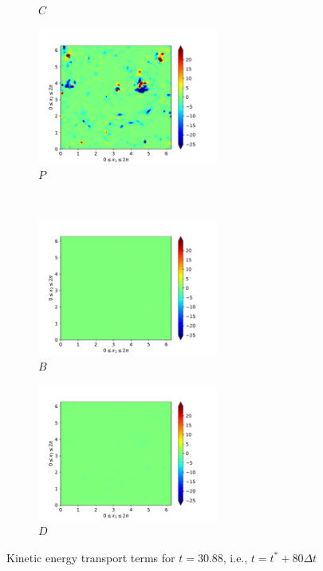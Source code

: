 \begin{figure}[H]
\begin{subfigure}{0.45\textwidth}
        \caption{$C$}
    \end{subfigure}
    \newline
    \begin{subfigure}{0.45\textwidth}
        \includegraphics[height=1.75in]{media/run-cds-65/P-ke-1420}
        \caption{$P$}
    \end{subfigure}
    ~
    \begin{subfigure}{0.45\textwidth}
        \includegraphics[height=1.75in]{media/run-cds-65/B-ke-1420}
        \caption{$B$}
    \end{subfigure}
    \newline
    \begin{subfigure}{0.45\textwidth}
        \includegraphics[height=1.75in]{media/run-cds-65/D-ke-1420}
        \caption{$D$}
    \end{subfigure}
    \caption{Kinetic energy transport terms for $t=30.88$, i.e., $t=t^{\ast} + 80 \Delta t$}
\end{figure}
